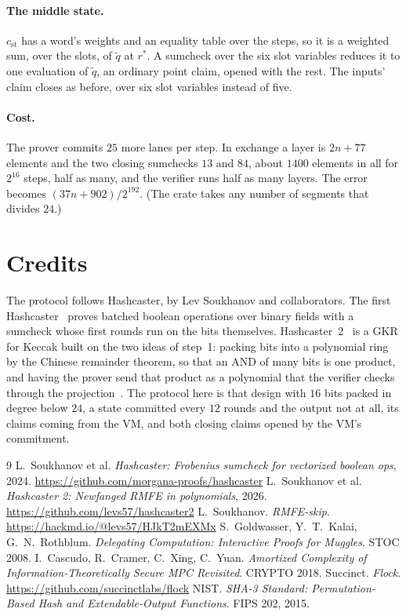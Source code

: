 \documentclass[11pt]{article}
\newcommand{\mle}[1]{\widetilde{#1}}
\begin{document}
\paragraph{The middle state.} $c_{\mathrm{st}}$ has a word's weights and an equality table over the steps, so it is a weighted sum, over the slots, of $\mle{q}$ at $r^*$. A sumcheck over the six slot variables reduces it to one evaluation of $\mle{q}$, an ordinary point claim, opened with the rest. The inputs' claim closes as before, over six slot variables instead of five.

\paragraph{Cost.} The prover commits $25$ more lanes per step. In exchange a layer is $2n + 77$ elements and the two closing sumchecks $13$ and $84$, about $1400$ elements in all for $2^{16}$ steps, half as many, and the verifier runs half as many layers. The error becomes $(37n + 902)/2^{192}$. (The crate takes any number of segments that divides $24$.)

\section{Credits}\label{sec:credits}

The protocol follows Hashcaster, by Lev Soukhanov and collaborators. The first Hashcaster~\cite{hashcaster} proves batched boolean operations over binary fields with a sumcheck whose first rounds run on the bits themselves. Hashcaster~2~\cite{hashcaster2} is a GKR for Keccak built on the two ideas of step~1: packing bits into a polynomial ring by the Chinese remainder theorem, so that an AND of many bits is one product, and having the prover send that product as a polynomial that the verifier checks through the projection~\cite{rmfeskip}. The protocol here is that design with $16$ bits packed in degree below $24$, a state committed every $12$ rounds and the output not at all, its claims coming from the VM, and both closing claims opened by the VM's commitment.

\begin{thebibliography}{9}
 L.~Soukhanov et al. \emph{Hashcaster: Frobenius sumcheck for vectorized boolean ops}, 2024. \url{https://github.com/morgana-proofs/hashcaster}
 L.~Soukhanov et al. \emph{Hashcaster 2: Newfanged RMFE in polynomials}, 2026. \url{https://github.com/levs57/hashcaster2}
 L.~Soukhanov. \emph{RMFE-skip}. \url{https://hackmd.io/@levs57/HJkT2mEXMx}
 S.~Goldwasser, Y.~T.~Kalai, G.~N.~Rothblum. \emph{Delegating Computation: Interactive Proofs for Muggles}. STOC 2008.
 I.~Cascudo, R.~Cramer, C.~Xing, C.~Yuan. \emph{Amortized Complexity of Information-Theoretically Secure MPC Revisited}. CRYPTO 2018.
 Succinct. \emph{Flock}. \url{https://github.com/succinctlabs/flock}
 NIST. \emph{SHA-3 Standard: Permutation-Based Hash and Extendable-Output Functions}. FIPS 202, 2015.
\end{thebibliography}
\end{document}
